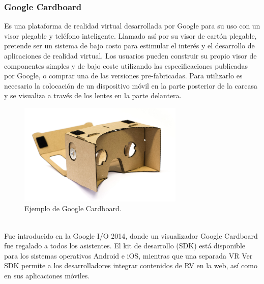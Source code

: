 \documentclass[12pt]{article}
\begin{document}
\subsubsection{Google Cardboard}
Es una plataforma de realidad virtual desarrollada por Google\cite{cardboard} para su uso con un visor plegable y teléfono inteligente. Llamado así por su visor de cartón plegable, pretende ser un sistema de bajo costo para estimular el interés y el desarrollo de aplicaciones de realidad virtual. Los usuarios pueden construir su propio visor de componentes simples y de bajo coste utilizando las especificaciones publicadas por Google, o comprar una de las versiones pre-fabricadas. Para utilizarlo es necesario  la colocación de un dispositivo móvil en la parte posterior de la carcasa y se  visualiza a través de los lentes en la parte delantera.
\begin{figure}[h!]
\includegraphics[width=0.7\textwidth,center]{google_cardboard.jpg}
\caption{Ejemplo de Google Cardboard.}
\end{figure}
\\Fue introducido en la Google I/O 2014, donde un visualizador Google Cardboard fue regalado a todos los asistentes. El kit de desarrollo (SDK) está disponible para los sistemas operativos Android e iOS, mientras que una separada VR Ver SDK permite a los desarrolladores integrar contenidos de RV en la web, así como en sus aplicaciones móviles. 
\end{document}
